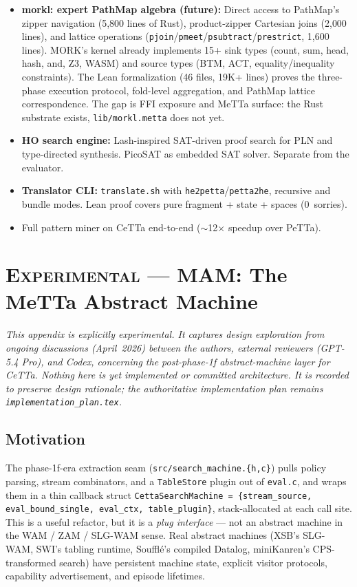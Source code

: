 \documentclass[11pt]{article}
\newcommand{\code}[1]{\texttt{#1}}
\newcommand{\PeTTa}{\textup{PeTTa}}
\newcommand{\CeTTa}{\textup{CeTTa}}
\newcommand{\PathMap}{\textup{PathMap}}
\begin{document}
\begin{itemize}
\item \textbf{morkl: expert \PathMap{} algebra (future):}  Direct access to
  \PathMap{}'s zipper navigation (5{,}800 lines of Rust), product-zipper
  Cartesian joins (2{,}000 lines), and lattice operations
  (\code{pjoin}/\code{pmeet}/\code{psubtract}/\code{prestrict}, 1{,}600
  lines).  MORK's kernel already implements 15+ sink types (count, sum, head,
  hash, and, Z3, WASM) and source types (BTM, ACT, equality/inequality
  constraints).  The Lean formalization (46 files, 19K+ lines) proves the
  three-phase execution protocol, fold-level aggregation, and \PathMap{}
  lattice correspondence.  The gap is FFI exposure and MeTTa surface: the
  Rust substrate exists, \code{lib/morkl.metta} does not yet.
\item \textbf{HO search engine:} Lash-inspired SAT-driven proof
  search for PLN and type-directed synthesis.  PicoSAT as
  embedded SAT solver.  Separate from the evaluator.
\item \textbf{Translator CLI:} \code{translate.sh} with
  \code{he2petta}/\code{petta2he}, recursive and bundle modes.
  Lean proof covers pure fragment + state + spaces (0~sorries).
\item Full pattern miner on \CeTTa{} end-to-end
  ($\sim$12$\times$ speedup over \PeTTa{}).
\end{itemize}

\appendix

\section{\textsc{Experimental} --- MAM: The MeTTa Abstract Machine}
\label{app:mam}

\emph{This appendix is explicitly experimental.  It captures design
exploration from ongoing discussions (April~2026) between the authors,
external reviewers (GPT-5.4 Pro), and Codex, concerning the
post-phase-1f abstract-machine layer for \CeTTa{}.  Nothing here is yet
implemented or committed architecture.  It is recorded to preserve
design rationale; the authoritative implementation plan remains
\code{implementation\_plan.tex}.}

\subsection{Motivation}

The phase-1f-era extraction seam (\code{src/search\_machine.\{h,c\}})
pulls policy parsing, stream combinators, and a \code{TableStore}
plugin out of \code{eval.c}, and wraps them in a thin callback struct
\code{CettaSearchMachine = \{stream\_source, eval\_bound\_single,
  eval\_ctx, table\_plugin\}}, stack-allocated at each call site.
This is a useful refactor, but it is a \emph{plug interface} — not an
abstract machine in the WAM / ZAM / SLG-WAM sense.  Real abstract
machines (XSB's SLG-WAM, SWI's tabling runtime, Soufflé's compiled
Datalog, miniKanren's CPS-transformed search) have persistent machine
state, explicit visitor protocols, capability advertisement, and
episode lifetimes.
\end{document}
